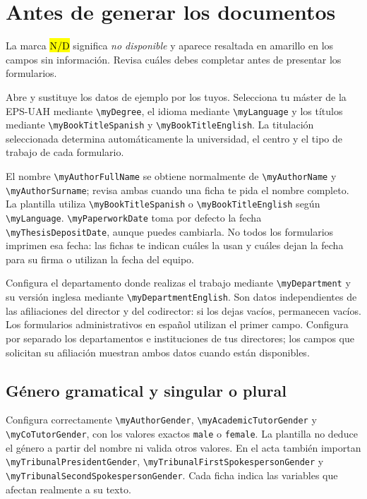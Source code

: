 \documentclass[10pt,a4paper]{article}
\newcommand{\variable}[1]{\texttt{\textbackslash{}}\nolinkurl{#1}}
\newcommand{\fichero}[1]{\path{#1}}
\begin{document}
\section{Antes de generar los documentos}

La marca \hl{N/D} significa \emph{no disponible} y aparece resaltada en amarillo en los campos sin información. Revisa cuáles debes completar antes de presentar los formularios.

Abre \fichero{Config/myconfig.tex} y sustituye los datos de ejemplo por los tuyos. Selecciona tu máster de la EPS-UAH mediante \variable{myDegree}, el idioma mediante \variable{myLanguage} y los títulos mediante \variable{myBookTitleSpanish} y \variable{myBookTitleEnglish}. La titulación seleccionada determina automáticamente la universidad, el centro y el tipo de trabajo de cada formulario.

El nombre \variable{myAuthorFullName} se obtiene normalmente de \variable{myAuthorName} y \variable{myAuthorSurname}; revisa ambas cuando una ficha te pida el nombre completo. La plantilla utiliza \variable{myBookTitleSpanish} o \variable{myBookTitleEnglish} según \variable{myLanguage}. \variable{myPaperworkDate} toma por defecto la fecha \variable{myThesisDepositDate}, aunque puedes cambiarla. No todos los formularios imprimen esa fecha: las fichas te indican cuáles la usan y cuáles dejan la fecha para su firma o utilizan la fecha del equipo.

Configura el departamento donde realizas el trabajo mediante \variable{myDepartment} y su versión inglesa mediante \variable{myDepartmentEnglish}. Son datos independientes de las afiliaciones del director y del codirector: si los dejas vacíos, permanecen vacíos. Los formularios administrativos en español utilizan el primer campo. Configura por separado los departamentos e instituciones de tus directores; los campos que solicitan su afiliación muestran ambos datos cuando están disponibles.

\subsection{Género gramatical y singular o plural}

Configura correctamente \variable{myAuthorGender}, \variable{myAcademicTutorGender} y \variable{myCoTutorGender}, con los valores exactos \texttt{male} o \texttt{female}. La plantilla no deduce el género a partir del nombre ni valida otros valores. En el acta también importan \variable{myTribunalPresidentGender}, \variable{myTribunalFirstSpokespersonGender} y \variable{myTribunalSecondSpokespersonGender}. Cada ficha indica las variables que afectan realmente a su texto.
\end{document}
